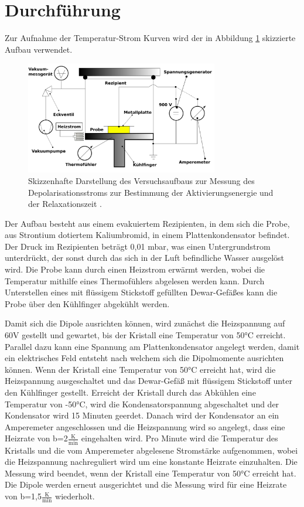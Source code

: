 \section{Durchführung}
\label{sec:durch}
Zur Aufnahme der Temperatur-Strom Kurven wird der in Abbildung \ref{fig:aufbau} skizzierte Aufbau verwendet.

\begin{figure}
    \centering
    \includegraphics[width=0.75\textwidth]{aufbau.png}
    \caption{Skizzenhafte Darstellung des Versuchsaufbaus zur Messung des Depolarisationsstroms zur Bestimmung der Aktivierungsenergie und der Relaxationszeit \cite{V48}.}
    \label{fig:aufbau}
  \end{figure}

\noindent
Der Aufbau besteht aus einem evakuiertem Rezipienten, in dem sich die Probe, aus Strontium dotiertem Kaliumbromid, in einem Plattenkondensator befindet.
Der Druck im Rezipienten beträgt 0,01 mbar, was einen Untergrundstrom unterdrückt, der sonst durch das sich in der Luft befindliche Wasser ausgelöst wird.
Die Probe kann durch einen Heizstrom erwärmt werden, wobei die Temperatur mithilfe eines Thermofühlers abgelesen werden kann.
Durch Unterstellen eines mit flüssigem Stickstoff gefüllten Dewar-Gefäßes kann die Probe über den Kühlfinger abgekühlt werden. 


\noindent
Damit sich die Dipole ausrichten können, wird zunächst die Heizspannung auf 60V gestellt und gewartet, bis der Kristall eine Temperatur von 50°C erreicht.
Parallel dazu kann eine Spannung am Plattenkondensator angelegt werden, damit ein elektrisches Feld entsteht nach welchem sich die Dipolmomente ausrichten können.
Wenn der Kristall eine Temperatur von 50°C erreicht hat, wird die Heizspannung ausgeschaltet und das Dewar-Gefäß mit flüssigem Stickstoff unter den Kühlfinger gestellt.
Erreicht der Kristall durch das Abkühlen eine Temperatur von -50°C, wird die Kondensatorspannung abgeschaltet und der Kondensator wird 15 Minuten geerdet.
Danach wird der Kondensator an ein Amperemeter angeschlossen und die Heizspannung wird so angelegt, dass eine Heizrate von b=2$\frac{\text{K}}{\text{min}}$ eingehalten wird.
Pro Minute wird die Temperatur des Kristalls und die vom Amperemeter abgelesene Stromstärke aufgenommen, wobei die Heizspannung nachreguliert wird um eine konstante Heizrate einzuhalten.
Die Messung wird beendet, wenn der Kristall eine Temperatur von 50°C erreicht hat.
Die Dipole werden erneut ausgerichtet und die Messung wird für eine Heizrate von b=1,5$\frac{\text{K}}{\text{min}}$ wiederholt.


